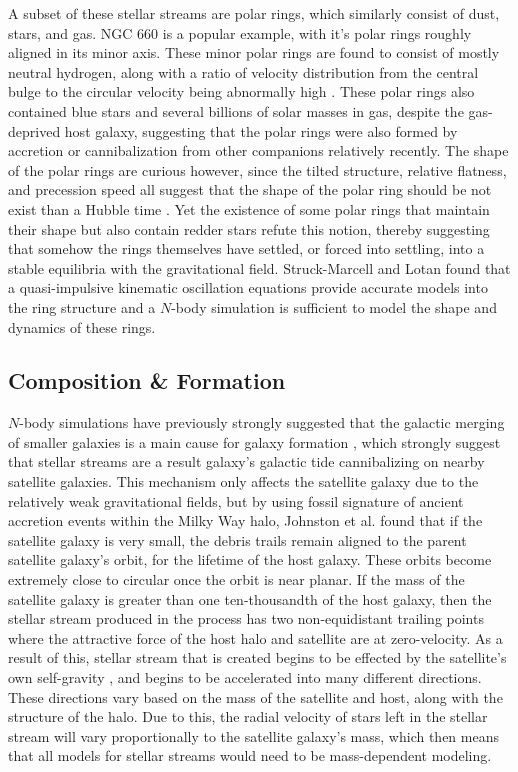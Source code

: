 \documentclass{article}
\begin{document}
\indent A subset of these stellar streams are polar rings, which similarly consist of dust, stars, and gas. NGC 660 is a popular example, with it's polar rings roughly aligned in its minor axis. These minor polar rings are found to consist of mostly neutral hydrogen, along with a ratio of velocity distribution from the central bulge to the circular velocity being abnormally high \cite{distributionOfAtomicHydrogen}. These polar rings also contained blue stars and several billions of solar masses in gas, despite the gas-deprived host galaxy, suggesting that the polar rings were also formed by accretion or cannibalization from other companions relatively recently. The shape of the polar rings are curious however, since the tilted structure, relative flatness, and precession speed all suggest that the shape of the polar ring should be not exist than a Hubble time \cite{selfGravitatingPolarRings}. Yet the existence of some polar rings that maintain their shape but also contain redder stars refute this notion, thereby suggesting that somehow the rings themselves have settled, or forced into settling, into a stable equilibria with the gravitational field. Struck-Marcell and Lotan found that a quasi-impulsive kinematic oscillation equations provide accurate models into the ring structure and a $N$-body simulation is sufficient to model the shape and dynamics of these rings. 

\subsection{Composition \& Formation} \indent $N$-body simulations have previously strongly suggested that the galactic merging of smaller galaxies is a main cause for galaxy formation \cite{galaxyNBody}, which strongly suggest that stellar streams are a result galaxy's galactic tide cannibalizing on nearby satellite galaxies. This mechanism only affects the satellite galaxy due to the relatively weak gravitational fields, but by using fossil signature of ancient accretion events within the Milky Way halo, Johnston et al. \cite{accretionEvents} found that if the satellite galaxy is very small, the debris trails remain aligned to the parent satellite galaxy's orbit, for the lifetime of the host galaxy. These orbits become extremely close to circular once the orbit is near planar. If the mass of the satellite galaxy is greater than one ten-thousandth of the host galaxy, then the stellar stream produced in the process has two non-equidistant trailing points where the attractive force of the host halo and satellite are at zero-velocity. As a result of this, stellar stream that is created begins to be effected by the satellite's own self-gravity \cite{dymanicsOfTidalTails}, and begins to be accelerated into many different directions. These directions vary based on the mass of the satellite and host, along with the structure of the halo. Due to this, the radial velocity of stars left in the stellar stream will vary proportionally to the satellite galaxy's mass, which then means that all models for stellar streams would need to be mass-dependent modeling. 
\end{document}

